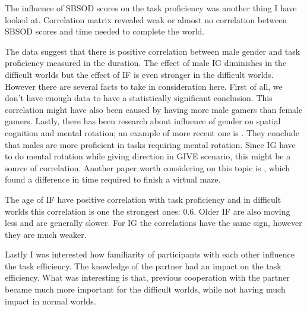 The influence of SBSOD scores on the task proficiency was another thing I have looked at. Correlation matrix revealed weak or almost no correlation between SBSOD scores and time needed to complete the world.

The data suggest that there is positive correlation between male gender and task proficiency measured in the duration. The effect of male IG diminishes in the difficult worlds but the effect of IF is even stronger in the difficult worlds. However there are several facts to take in consideration here. First of all, we don't have enough data to have a statistically significant conclusion. This correlation might have also been caused by having more male gamers than female gamers. Lastly, there has been research about influence of gender on spatial cognition and mental rotation; an example of more recent one is \citep{geary2000sex}. They conclude that males are more proficient in tasks requiring mental rotation. Since IG have to do mental rotation while giving direction in GIVE scenario, this might be a source of correlation. Another paper worth considering on this topic is \citep{moffat1998navigation}, which found a difference in time required to finish a virtual maze.

The age of IF have positive correlation with task proficiency and in difficult worlds this correlation is one the strongest ones: 0.6. Older IF are also moving less and are generally slower. For IG the correlations have the same sign, however they are much weaker.

Lastly  I was interested how familiarity of participants with each other influence the task efficiency. The knowledge of the partner had an impact on the task efficiency. What was interesting is that, previous cooperation with the partner became much more important for the difficult worlds, while not having much impact in normal worlds.

